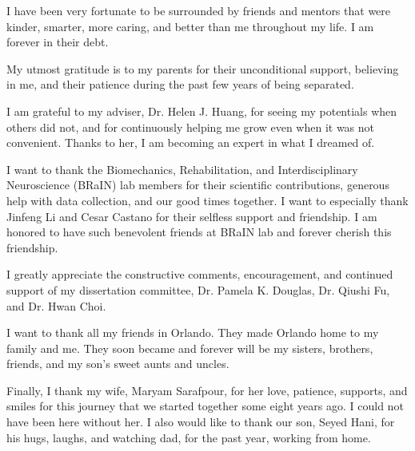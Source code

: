\documentclass{UCF_ETD}
\begin{document}
\begin{acknowledgments}
I have been very fortunate to be surrounded by friends and mentors that were kinder, smarter, more caring, and better than me throughout my life. I am forever in their debt.

My utmost gratitude is to my parents for their unconditional support, believing in me, and their patience during the past few years of being separated.

I am grateful to my adviser, Dr. Helen J. Huang, for seeing my potentials when others did not, and for continuously helping me grow even when it was not convenient. Thanks to her, I am becoming an expert in what I dreamed of.

I want to thank the Biomechanics, Rehabilitation, and Interdisciplinary Neuroscience (BRaIN) lab members for their scientific contributions, generous help with data collection, and our good times together. I want to especially thank Jinfeng Li and Cesar Castano for their selfless support and friendship. I am honored to have such benevolent friends at BRaIN lab and forever cherish this friendship.

I greatly appreciate the constructive comments, encouragement, and continued support of my dissertation committee, Dr. Pamela K. Douglas, Dr. Qiushi Fu, and Dr. Hwan Choi.

I want to thank all my friends in Orlando. They made Orlando home to my family and me. They soon became and forever will be my sisters, brothers, friends, and my son's sweet aunts and uncles.

Finally, I thank my wife, Maryam Sarafpour, for her love, patience, supports, and smiles for this journey that we started together some eight years ago. I could not have been here without her. I also would like to thank our son, Seyed Hani, for his hugs, laughs, and watching dad, for the past year, working from home.
\end{acknowledgments}

\tableofcontents

\listoffigures

\listoftables

\mainmatter




\end{document}
